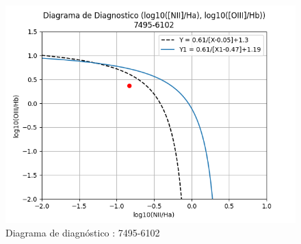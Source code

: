 \documentclass[9pt,twocolumn,a4paper]{opticajnl}
\begin{document}
\begin{figure}
  \begin{center}
    \includegraphics[width=1\linewidth]{../Codigos/diagramasDeDiagnostico/diagramadiag_7495-6102.png}
  \end{center}
  \caption{Diagrama de diagnóstico : 7495-6102}\label{fig:diagramadiag_7495-6102}
\end{figure}
\end{document}
